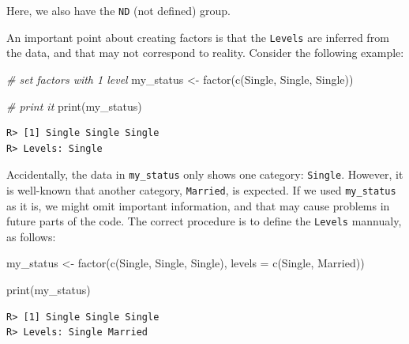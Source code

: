 \documentclass[
  12pt,
]{book}
\newenvironment{Shaded}{\begin{snugshade}}{\end{snugshade}}
\newcommand{\AttributeTok}[1]{\textcolor[rgb]{0.61,0.61,0.61}{#1}}
\newcommand{\CommentTok}[1]{\textcolor[rgb]{0.37,0.37,0.37}{\textit{#1}}}
\newcommand{\FunctionTok}[1]{\textcolor[rgb]{0,0,0}{#1}}
\newcommand{\NormalTok}[1]{#1}
\newcommand{\OtherTok}[1]{\textcolor[rgb]{0.37,0.37,0.37}{#1}}
\newcommand{\StringTok}[1]{\textcolor[rgb]{0.5,0.5,0.5}{#1}}
\begin{document}
Here, we also have the \texttt{ND} (not defined) group.

An important point about creating factors is that the \texttt{Levels} are inferred from the data, and that may not correspond to reality. Consider the following example:

\begin{Shaded}
\begin{Highlighting}[]
\CommentTok{\# set factors with 1 level}
\NormalTok{my\_status }\OtherTok{\textless{}{-}} \FunctionTok{factor}\NormalTok{(}\FunctionTok{c}\NormalTok{(}\StringTok{\textquotesingle{}Single\textquotesingle{}}\NormalTok{, }\StringTok{\textquotesingle{}Single\textquotesingle{}}\NormalTok{, }\StringTok{\textquotesingle{}Single\textquotesingle{}}\NormalTok{))}

\CommentTok{\# print it}
\FunctionTok{print}\NormalTok{(my\_status)}
\end{Highlighting}
\end{Shaded}

\begin{verbatim}
R> [1] Single Single Single
R> Levels: Single
\end{verbatim}

Accidentally, the data in \texttt{my\_status} only shows one category: \texttt{Single}. However, it is well-known that another category, \texttt{Married}, is expected. If we used \texttt{my\_status} as it is, we might omit important information, and that may cause problems in future parts of the code. The correct procedure is to define the \texttt{Levels} mannualy, as follows:

\begin{Shaded}
\begin{Highlighting}[]
\NormalTok{my\_status }\OtherTok{\textless{}{-}} \FunctionTok{factor}\NormalTok{(}\FunctionTok{c}\NormalTok{(}\StringTok{\textquotesingle{}Single\textquotesingle{}}\NormalTok{, }\StringTok{\textquotesingle{}Single\textquotesingle{}}\NormalTok{, }\StringTok{\textquotesingle{}Single\textquotesingle{}}\NormalTok{),}
                    \AttributeTok{levels =} \FunctionTok{c}\NormalTok{(}\StringTok{\textquotesingle{}Single\textquotesingle{}}\NormalTok{, }\StringTok{\textquotesingle{}Married\textquotesingle{}}\NormalTok{))}

\FunctionTok{print}\NormalTok{(my\_status)}
\end{Highlighting}
\end{Shaded}

\begin{verbatim}
R> [1] Single Single Single
R> Levels: Single Married
\end{verbatim}
\end{document}

